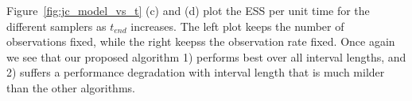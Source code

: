   Figure~\ref{fig:jc_model_vs_t} (c) and (d) plot the ESS per unit time for the
  different samplers as $t_{end}$ increases. 
  The left plot keeps the number of observations fixed, while the right keepss the observation rate fixed. 
Once again we see that our proposed algorithm
1) performs best over all interval lengths, and 2) suffers a performance
degradation with interval length that is much milder than the other algorithms.

